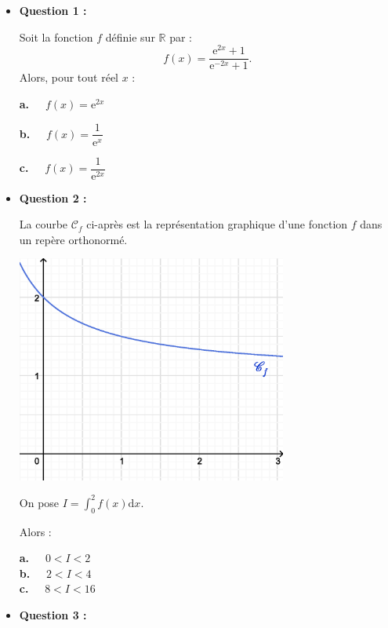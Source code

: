 \begin{itemize}
     \item \textbf{Question 1 :}
     \par
     Soit la fonction $f$ définie sur $\mathbb{R}$ par :
     \[ f(x)=\dfrac{\text{e}^{2x}+1}{\text{e}^{-2x}+1}. \]
     Alors, pour tout réel $x$ :
     \par
     \textbf{a.~~} $f(x)=\text{e}^{2x}$
     \par
     \textbf{b.~~}  $f(x)=\dfrac{1}{\text{e}^{x}}$
     \par
     \textbf{c.~~}  $f(x)=\dfrac{1}{\text{e}^{2x}}$
     \par
\medskip
     \item \textbf{Question 2 :}
     \par
     La courbe $\mathscr{C}_f$ ci-après est la représentation graphique d'une fonction $f$ dans un repère orthonormé.
     \begin{center}
          \begin{extern}%
               \includegraphics[width=0.7\textwidth]{images/BBESL-s4-1-1}%
          \end{extern}
     \end{center}
     On pose $I= \displaystyle\int_{0}^{2}f(x)\text{d}x$.
     \par
     Alors :
     \par
     \textbf{a.~~} $0 < I < 2$ \\
     \textbf{b.~~} $2 < I < 4$ \\
     \textbf{c.~~} $8 < I < 16$ \\
\par
     \item \textbf{Question 3 :}
     \par

\end{itemize}
